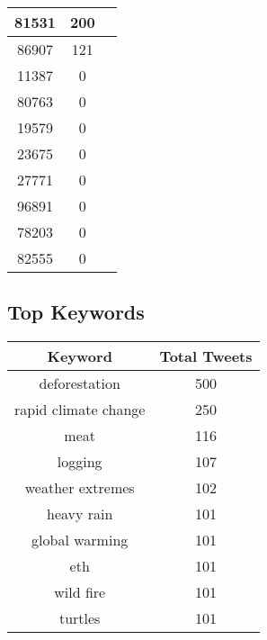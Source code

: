 \documentclass{article}\usepackage[T1]{fontenc}
\begin{document}
\begin{tabular}{|c|c|c|}
 \hline
81531 & 200\\ 
 \hline
86907 & 121\\ 
 \hline
11387 & 0\\ 
 \hline
80763 & 0\\ 
 \hline
19579 & 0\\ 
 \hline
23675 & 0\\ 
 \hline
27771 & 0\\ 
 \hline
96891 & 0\\ 
 \hline
78203 & 0\\ 
 \hline
82555 & 0\\ 
 \hline
\end{tabular}\subsection*{Top Keywords}\begin{tabular}{|c|c|}         \hline         Keyword & Total Tweets \\ 
 \hline
deforestation & 500\\ 
 \hline
rapid climate change & 250\\ 
 \hline
meat & 116\\ 
 \hline
logging & 107\\ 
 \hline
weather extremes & 102\\ 
 \hline
heavy rain & 101\\ 
 \hline
global warming & 101\\ 
 \hline
eth & 101\\ 
 \hline
wild fire & 101\\ 
 \hline
turtles & 101\\ 
 \hline
\end{tabular}
\end{document}
